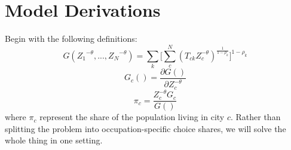 \documentclass[12pt]{article}
\begin{document}
\section{Model Derivations}
Begin with the following definitions:
\begin{equation*}
    G({Z_{1}}^{-\theta},...,{Z_{N}}^{-\theta})=\sum\limits_{k}\Big[\sum\limits_{c}^{N}({T_{ck}}{Z_{c}^{-\theta}})^{\frac{1}{1-\rho_{k}}}\Big]^{1-\rho_{k}}
\end{equation*}
\begin{equation*}
    G_{c}()=\frac{\partial{G()}}{\partial{Z_{c}^{-\theta}}}
\end{equation*}
\begin{equation*}
    \pi_{c}=\frac{Z_{c}^{-\theta}{G_{c}}}{G()}
\end{equation*}
where $\pi_{c}$ represent the share of the population living in city $c$. Rather than splitting the problem into occupation-specific choice shares, we will solve the whole thing in one setting.
\end{document}
